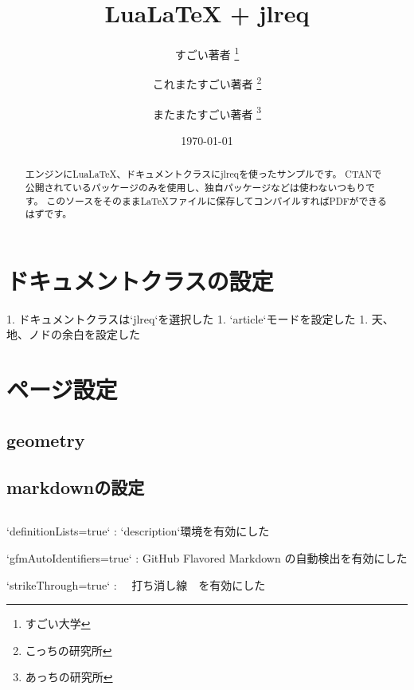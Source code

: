 \documentclass[
    article,
    head_space=25truemm,
    foot_space=10truemm,
    gutter=15truemm]{jlreq}
\title{LuaLaTeX + jlreq}
\author{
    すごい著者 \thanks{すごい大学} \\ \and
    これまたすごい著者 \thanks{こっちの研究所} \\ \and
    またまたすごい著者 \thanks{あっちの研究所}
}
\date{\today}
\begin{document}
\maketitle

\begin{abstract}
エンジンにLuaLaTeX、ドキュメントクラスにjlreqを使ったサンプルです。
CTANで公開されているパッケージのみを使用し、独自パッケージなどは使わないつもりです。
このソースをそのままLaTeXファイルに保存してコンパイルすればPDFができるはずです。
\end{abstract}

\tableofcontents

\section{ドキュメントクラスの設定}


\begin{markdown}
1. ドキュメントクラスは`jlreq`を選択した
1. `article`モードを設定した
1. 天、地、ノドの余白を設定した
\end{markdown}


\section{ページ設定}

\subsection{geometry}

\subsection{markdownの設定}

\inputminted{latex}{preamble/markdown.tex}

\begin{markdown}
`definitionLists=true`
: `description`環境を有効にした

`gfmAutoIdentifiers=true`
: GitHub Flavored Markdown の自動検出を有効にした

`strikeThrough=true`
: ~~打ち消し線~~を有効にした
\end{markdown}
\end{document}
